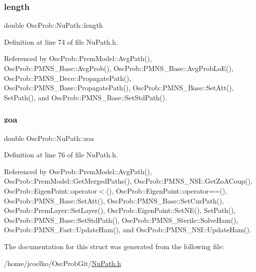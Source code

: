 \mbox{\label{structOscProb_1_1NuPath_af22660894b6e25cf835500381b155557}} 
\subsubsection{\texorpdfstring{length}{length}}
{\footnotesize\ttfamily double Osc\+Prob\+::\+Nu\+Path\+::length}



Definition at line 74 of file Nu\+Path.\+h.



Referenced by Osc\+Prob\+::\+Prem\+Model\+::\+Avg\+Path(), Osc\+Prob\+::\+P\+M\+N\+S\+\_\+\+Base\+::\+Avg\+Prob(), Osc\+Prob\+::\+P\+M\+N\+S\+\_\+\+Base\+::\+Avg\+Prob\+Lo\+E(), Osc\+Prob\+::\+P\+M\+N\+S\+\_\+\+Deco\+::\+Propagate\+Path(), Osc\+Prob\+::\+P\+M\+N\+S\+\_\+\+Base\+::\+Propagate\+Path(), Osc\+Prob\+::\+P\+M\+N\+S\+\_\+\+Base\+::\+Set\+Att(), Set\+Path(), and Osc\+Prob\+::\+P\+M\+N\+S\+\_\+\+Base\+::\+Set\+Std\+Path().

\mbox{\label{structOscProb_1_1NuPath_af3213f3691ba83c6bc05f4a3490f6b31}} 
\subsubsection{\texorpdfstring{zoa}{zoa}}
{\footnotesize\ttfamily double Osc\+Prob\+::\+Nu\+Path\+::zoa}



Definition at line 76 of file Nu\+Path.\+h.



Referenced by Osc\+Prob\+::\+Prem\+Model\+::\+Avg\+Path(), Osc\+Prob\+::\+Prem\+Model\+::\+Get\+Merged\+Paths(), Osc\+Prob\+::\+P\+M\+N\+S\+\_\+\+N\+S\+I\+::\+Get\+Zo\+A\+Coup(), Osc\+Prob\+::\+Eigen\+Point\+::operator$<$(), Osc\+Prob\+::\+Eigen\+Point\+::operator==(), Osc\+Prob\+::\+P\+M\+N\+S\+\_\+\+Base\+::\+Set\+Att(), Osc\+Prob\+::\+P\+M\+N\+S\+\_\+\+Base\+::\+Set\+Cur\+Path(), Osc\+Prob\+::\+Prem\+Layer\+::\+Set\+Layer(), Osc\+Prob\+::\+Eigen\+Point\+::\+Set\+N\+E(), Set\+Path(), Osc\+Prob\+::\+P\+M\+N\+S\+\_\+\+Base\+::\+Set\+Std\+Path(), Osc\+Prob\+::\+P\+M\+N\+S\+\_\+\+Sterile\+::\+Solve\+Ham(), Osc\+Prob\+::\+P\+M\+N\+S\+\_\+\+Fast\+::\+Update\+Ham(), and Osc\+Prob\+::\+P\+M\+N\+S\+\_\+\+N\+S\+I\+::\+Update\+Ham().



The documentation for this struct was generated from the following file\+:\begin{DoxyCompactItemize}
\item 
/home/jcoelho/\+Osc\+Prob\+Git/\hyperlink{NuPath_8h}{Nu\+Path.\+h}\end{DoxyCompactItemize}

